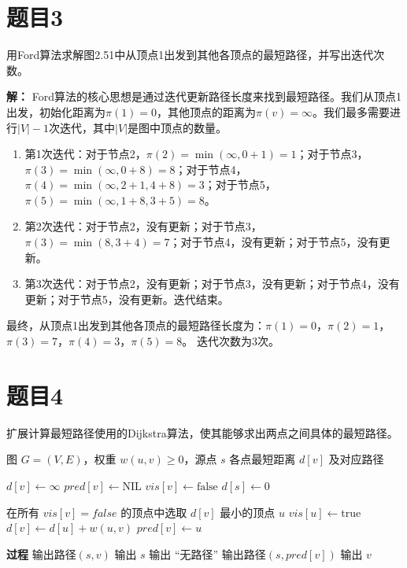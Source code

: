 \documentclass[utf8]{ctexart}
\theoremstyle{mystyle}
\begin{document}
\section*{题目3}
\begin{problembox}
    用Ford算法求解图2.51中从顶点1出发到其他各顶点的最短路径，并写出迭代次数。
\end{problembox}
\textbf{解：} Ford算法的核心思想是通过迭代更新路径长度来找到最短路径。我们从顶点1出发，初始化距离为$\pi(1) = 0$，其他顶点的距离为$\pi(v) = \infty$。我们最多需要进行$|V| - 1$次迭代，其中$|V|$是图中顶点的数量。
\begin{enumerate}
    \item 第1次迭代：对于节点2，$\pi(2) = \min(\infty, 0 + 1) = 1$；对于节点3，$\pi(3) = \min(\infty, 0 + 8) = 8$；对于节点4，$\pi(4) = \min(\infty, 2 + 1, 4 + 8) = 3$；对于节点5，$\pi(5) = \min(\infty, 1 + 8, 3 + 5) = 8$。
    \item 第2次迭代：对于节点2，没有更新；对于节点3，$\pi(3) = \min(8, 3 + 4) = 7$；对于节点4，没有更新；对于节点5，没有更新。
    \item 第3次迭代：对于节点2，没有更新；对于节点3，没有更新；对于节点4，没有更新；对于节点5，没有更新。迭代结束。
\end{enumerate}
最终，从顶点1出发到其他各顶点的最短路径长度为：$\pi(1) = 0$，$\pi(2) = 1$，$\pi(3) = 7$，$\pi(4) = 3$，$\pi(5) = 8$。
迭代次数为3次。

\section*{题目4}
\begin{problembox}
扩展计算最短路径使用的Dijkstra算法，使其能够求出两点之间具体的最短路径。
\end{problembox}

\begin{algorithm}
\caption{Dijkstra算法（$O(n^2)$，带路径恢复）}
\begin{algorithmic}[1]
\REQUIRE 图 $G=(V,E)$，权重 $w(u,v)\ge 0$，源点 $s$
\ENSURE 各点最短距离 $d[v]$ 及对应路径

    \STATE $d[v] \leftarrow \infty$
    \STATE $pred[v] \leftarrow \text{NIL}$ 
    \STATE $vis[v] \leftarrow \text{false}$ 
\ENDFOR
\STATE $d[s] \leftarrow 0$

    \STATE 在所有 $vis[v]=false$ 的顶点中选取 $d[v]$ 最小的顶点 $u$
    \STATE $vis[u] \leftarrow \text{true}$
            \STATE $d[v] \leftarrow d[u] + w(u,v)$
            \STATE $pred[v] \leftarrow u$
        \ENDIF
    \ENDFOR
\ENDFOR

\STATE \textbf{过程} 输出路径$(s, v)$
    \STATE 输出 $s$
    \STATE 输出 ``无路径''
\ELSE
    \STATE 输出路径$(s, pred[v])$
    \STATE 输出 $v$
\ENDIF

\end{algorithmic}
\end{algorithm}
\end{document}
